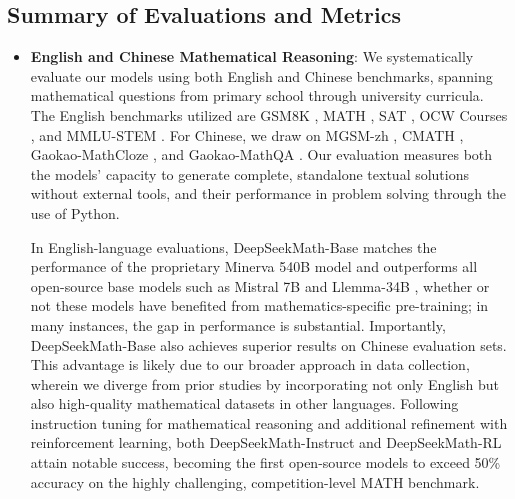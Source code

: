\subsection{Summary of Evaluations and Metrics}

\begin{itemize}[topsep=0pt]
    \item \textbf{English and Chinese Mathematical Reasoning}: We systematically evaluate our models using both English and Chinese benchmarks, spanning mathematical questions from primary school through university curricula. The English benchmarks utilized are GSM8K \citep{gsm8k}, MATH \citep{MATH}, SAT \citep{llemma}, OCW Courses \citep{minerva}, and MMLU-STEM \citep{mmlu}. For Chinese, we draw on MGSM-zh \citep{mgsm}, CMATH \citep{wei2023cmath}, Gaokao-MathCloze \citep{agieval}, and Gaokao-MathQA \citep{agieval}. Our evaluation measures both the models' capacity to generate complete, standalone textual solutions without external tools, and their performance in problem solving through the use of Python.

In English-language evaluations, DeepSeekMath-Base matches the performance of the proprietary Minerva 540B model \citep{minerva} and outperforms all open-source base models such as Mistral 7B \citep{mistral} and Llemma-34B \citep{llemma}, whether or not these models have benefited from mathematics-specific pre-training; in many instances, the gap in performance is substantial. Importantly, DeepSeekMath-Base also achieves superior results on Chinese evaluation sets. This advantage is likely due to our broader approach in data collection, wherein we diverge from prior studies \citep{minerva,llemma} by incorporating not only English but also high-quality mathematical datasets in other languages. Following instruction tuning for mathematical reasoning and additional refinement with reinforcement learning, both DeepSeekMath-Instruct and DeepSeekMath-RL attain notable success, becoming the first open-source models to exceed 50\% accuracy on the highly challenging, competition-level MATH benchmark.


\end{itemize}
